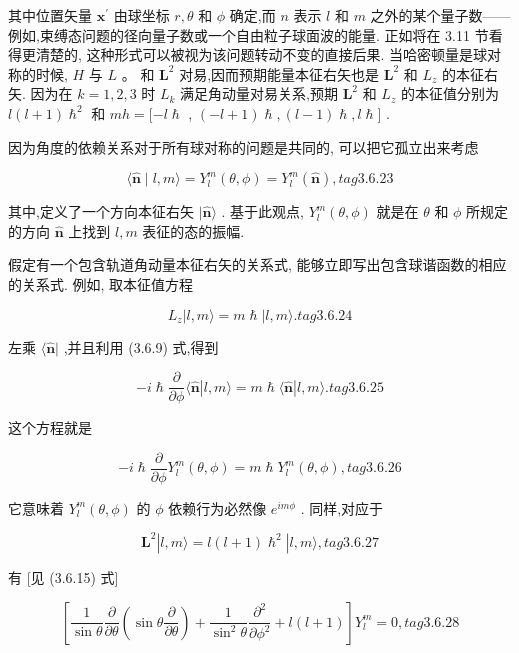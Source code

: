 其中位置矢量 ${\mathbf{x}}^{\prime }$ 由球坐标 $r,\theta$ 和 $\phi$ 确定,而 $n$ 表示 $l$ 和 $m$ 之外的某个量子数——例如,束缚态问题的径向量子数或一个自由粒子球面波的能量. 正如将在 3.11 节看得更清楚的, 这种形式可以被视为该问题转动不变的直接后果. 当哈密顿量是球对称的时候, $H$ 与 $L$ 。 和 ${\mathbf{L}}^{2}$ 对易,因而预期能量本征右矢也是 ${\mathbf{L}}^{2}$ 和 ${L}_{z}$ 的本征右矢. 因为在 $k = 1,2,3$ 时 ${L}_{k}$ 满足角动量对易关系,预期 ${\mathbf{L}}^{2}$ 和 ${L}_{z}$ 的本征值分别为 $l\left( {l + 1}\right) {\hslash }^{2}$ 和 ${mh} = \lbrack - l\hslash$ , $\left( -l + 1\right) \hslash,\left( l - 1\right) \hslash, l\hslash \rbrack$ .

因为角度的依赖关系对于所有球对称的问题是共同的, 可以把它孤立出来考虑

$$
\langle \widehat{\mathbf{n}} \mid l, m\rangle = {Y}_{l}^{m}\left( {\theta ,\phi }\right) = {Y}_{l}^{m}\left( \widehat{\mathbf{n}}\right) , tag{3. 6.23}
$$

其中,定义了一个方向本征右矢 $|\widehat{\mathbf{n}}\rangle$ . 基于此观点, ${Y}_{l}^{m}\left( {\theta ,\phi }\right)$ 就是在 $\theta$ 和 $\phi$ 所规定的方向 $\widehat{\mathbf{n}}$ 上找到 $l, m$ 表征的态的振幅.

假定有一个包含轨道角动量本征右矢的关系式, 能够立即写出包含球谐函数的相应的关系式. 例如, 取本征值方程

$$
{L}_{z}\left| {l, m\rangle = m\hslash }\right| l, m\rangle . tag{3. 6.24}
$$

左乘 $\langle \widehat{\mathbf{n}}|$ ,并且利用 (3.6.9) 式,得到

$$
- i\hslash \frac{\partial }{\partial \phi }\langle \widehat{\mathbf{n}}\left| {l, m\rangle = m\hslash \langle \widehat{\mathbf{n}}}\right| l, m\rangle . tag{3. 6.25}
$$

这个方程就是

$$
- i\hslash \frac{\partial }{\partial \phi }{Y}_{l}^{m}\left( {\theta ,\phi }\right) = m\hslash {Y}_{l}^{m}\left( {\theta ,\phi }\right) , tag{3. 6.26}
$$

它意味着 ${Y}_{l}^{m}\left( {\theta ,\phi }\right)$ 的 $\phi$ 依赖行为必然像 ${e}^{im\phi }$ . 同样,对应于

$$
{\mathbf{L}}^{2}\left| {l, m\rangle = l\left( {l + 1}\right) {\hslash }^{2}}\right| l, m\rangle , tag{3. 6.27}
$$

有 [见 (3.6.15) 式]

$$
\left\lbrack {\frac{1}{\sin \theta }\frac{\partial }{\partial \theta }\left( {\sin \theta \frac{\partial }{\partial \theta }}\right) + \frac{1}{{\sin }^{2}\theta }\frac{{\partial }^{2}}{\partial {\phi }^{2}} + l\left( {l + 1}\right) }\right\rbrack {Y}_{l}^{m} = 0, tag{3. 6.28}
$$

